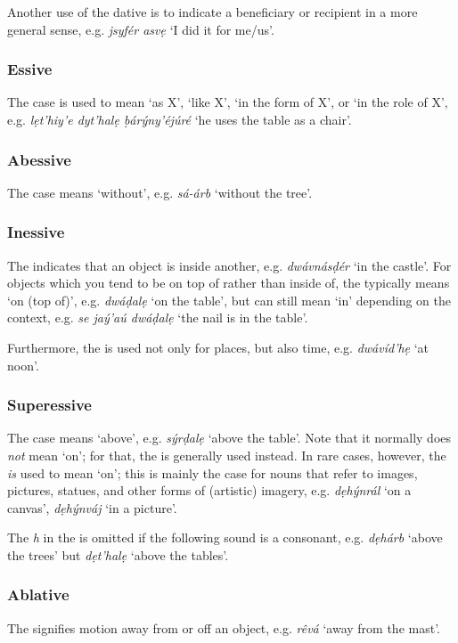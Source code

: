 \documentclass[a4paper, 12pt, twoside, final]{article}
\let \w \textit
\begin{document}
Another use of the dative is to indicate a beneficiary or recipient in a more general sense, e.g. \w{jsyfér asvẹ} ‘I did
it for me/us’.

\subsubsection{Essive}
The  case is used to mean ‘as X’, ‘like X’, ‘in the form of X’, or ‘in the role of X’, e.g. \w{lẹt’hiy’e dyt’halẹ ḅárýny’éjúré}
‘he uses the table as a chair’.

\subsubsection{Abessive}
The  case means ‘without’, e.g. \w{sá-árb} ‘without the tree’.

\subsubsection{Inessive}
The  indicates that an object is inside another, e.g. \w{dwávnásḍér} ‘in the castle’. For objects which you tend
to be on top of rather than inside of, the  typically means ‘on (top of)’, e.g. \w{dwáḍalẹ} ‘on the table’, but
can still mean ‘in’ depending on the context, e.g. \w{se jaý’aú dwáḍalẹ} ‘the nail is in the table’.

Furthermore, the  is used not only for places, but also time, e.g. \w{dwávíd’hẹ} ‘at noon’.

\subsubsection{Superessive}
The  case means ‘above’, e.g. \w{sýrḍalẹ} ‘above the table’. Note that it normally does \textit{not} mean
‘on’; for that, the  is generally used instead. In rare cases, however, the  \textit{is} used to mean
‘on’; this is mainly the case for nouns that refer to images, pictures, statues, and other forms of (artistic) imagery,
e.g. \w{dẹhýnrál} ‘on a canvas’, \w{dẹhýnváj} ‘in a picture’.


The \w{h} in the  is omitted if the following sound is a consonant, e.g. \w{dẹhárb} ‘above the trees’
but \w{dẹt’halẹ} ‘above the tables’.

\subsubsection{Ablative}
The  signifies motion away from or off an object, e.g. \w{rêvá} ‘away from the mast’.
\end{document}
